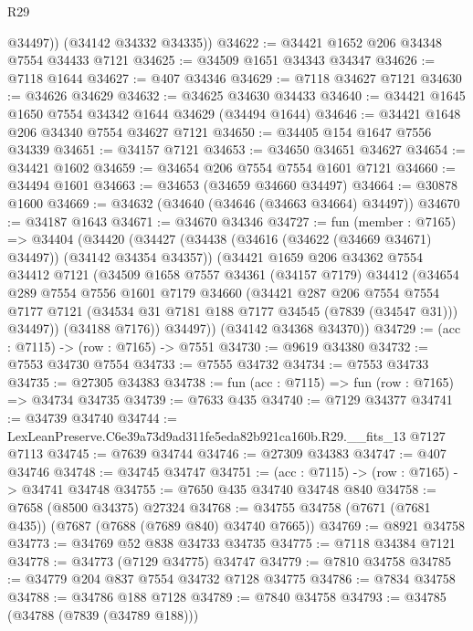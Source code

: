 \begin{lexlean}{R29}
\begin{coremodule}
          @34497))
      (@34142 @34332 @34335))
@34622 := @34421 @1652 @206 @34348 @7554 @34433 @7121
@34625 := @34509 @1651 @34343 @34347
@34626 := @7118 @1644
@34627 := @407 @34346
@34629 := @7118 @34627 @7121
@34630 := @34626 @34629
@34632 := @34625 @34630 @34433
@34640 := @34421 @1645 @1650 @7554 @34342 @1644 @34629 (@34494 @1644)
@34646 := @34421 @1648 @206 @34340 @7554 @34627 @7121
@34650 := @34405 @154 @1647 @7556 @34339
@34651 := @34157 @7121
@34653 := @34650 @34651 @34627
@34654 := @34421 @1602
@34659 := @34654 @206 @7554 @7554 @1601 @7121
@34660 := @34494 @1601
@34663 := @34653 (@34659 @34660 @34497)
@34664 := @30878 @1600
@34669 := @34632 (@34640 (@34646 (@34663 @34664) @34497))
@34670 := @34187 @1643
@34671 := @34670 @34346
@34727 := fun (member : @7165) =>
  @34404
    (@34420
      (@34427
        (@34438 (@34616 (@34622 (@34669 @34671) @34497)) (@34142 @34354 @34357))
        (@34421
          @1659
          @206
          @34362
          @7554
          @34412
          @7121
          (@34509
            @1658
            @7557
            @34361
            (@34157 @7179)
            @34412
            (@34654
              @289
              @7554
              @7556
              @1601
              @7179
              @34660
              (@34421
                @287
                @206
                @7554
                @7554
                @7177
                @7121
                (@34534 @31 @7181 @188 @7177 @34545 (@7839 (@34547 @31)))
                @34497))
            (@34188 @7176))
          @34497))
      (@34142 @34368 @34370))
@34729 := (acc : @7115) -> (row : @7165) -> @7551
@34730 := @9619 @34380
@34732 := @7553 @34730 @7554
@34733 := @7555 @34732
@34734 := @7553 @34733
@34735 := @27305 @34383
@34738 := fun (acc : @7115) => fun (row : @7165) => @34734 @34735
@34739 := @7633 @435
@34740 := @7129 @34377
@34741 := @34739 @34740
@34744 := LexLeanPreserve.C6e39a73d9ad311fe5eda82b921ca160b.R29.__fits_13 @7127 @7113
@34745 := @7639 @34744
@34746 := @27309 @34383
@34747 := @407 @34746
@34748 := @34745 @34747
@34751 := (acc : @7115) -> (row : @7165) -> @34741 @34748
@34755 := @7650 @435 @34740 @34748 @840
@34758 := @7658 (@8500 @34375) @27324
@34768 := @34755 @34758 (@7671 (@7681 @435)) (@7687 (@7688 (@7689 @840) @34740 @7665))
@34769 := @8921 @34758
@34773 := @34769 @52 @838 @34733 @34735
@34775 := @7118 @34384 @7121
@34778 := @34773 (@7129 @34775) @34747
@34779 := @7810 @34758
@34785 := @34779 @204 @837 @7554 @34732 @7128 @34775
@34786 := @7834 @34758
@34788 := @34786 @188 @7128
@34789 := @7840 @34758
@34793 := @34785 (@34788 (@7839 (@34789 @188)))

\end{coremodule}
\end{lexlean}
